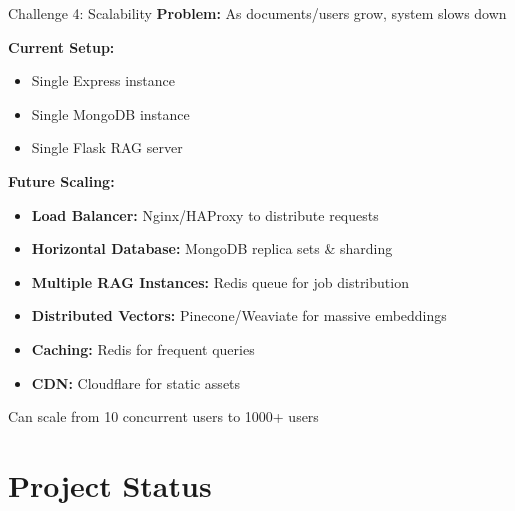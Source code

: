 \documentclass[11pt,aspectratio=16:9]{beamer}
\begin{document}
\begin{frame}{Challenge 4: Scalability}
    \textbf{Problem:} As documents/users grow, system slows down
    
    \vspace{0.5cm}
    
    \textbf{Current Setup:}
    \begin{itemize}
        \item Single Express instance
        \item Single MongoDB instance
        \item Single Flask RAG server
    \end{itemize}
    
    \vspace{0.5cm}
    
    \textbf{Future Scaling:}
    \begin{itemize}
        \item \textbf{Load Balancer:} Nginx/HAProxy to distribute requests
        \item \textbf{Horizontal Database:} MongoDB replica sets \& sharding
        \item \textbf{Multiple RAG Instances:} Redis queue for job distribution
        \item \textbf{Distributed Vectors:} Pinecone/Weaviate for massive embeddings
        \item \textbf{Caching:} Redis for frequent queries
        \item \textbf{CDN:} Cloudflare for static assets
    \end{itemize}
    
    \vspace{0.3cm}
    {\small Can scale from 10 concurrent users to 1000+ users}
\end{frame}

\section{Project Status}
\end{document}
